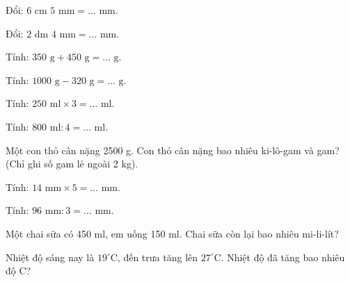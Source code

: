 \begin{ex}
Đổi: $6\text{ cm } 5\text{ mm} = \dots\text{ mm}$.
\end{ex}

\begin{ex}
Đổi: $2\text{ dm } 4\text{ mm} = \dots\text{ mm}$.
\end{ex}

\begin{ex}
Tính: $350\text{ g} + 450\text{ g} = \dots\text{ g}$.
\end{ex}

\begin{ex}
Tính: $1000\text{ g} - 320\text{ g} = \dots\text{ g}$.
\end{ex}

\begin{ex}
Tính: $250\text{ ml} \times 3 = \dots\text{ ml}$.
\end{ex}

\begin{ex}
Tính: $800\text{ ml} : 4 = \dots\text{ ml}$.
\end{ex}

\begin{ex}
Một con thỏ cân nặng 2500 g. Con thỏ cân nặng bao nhiêu ki-lô-gam và gam? (Chỉ ghi số gam lẻ ngoài 2 kg).
\end{ex}

\begin{ex}
Tính: $14\text{ mm} \times 5 = \dots\text{ mm}$.
\end{ex}

\begin{ex}
Tính: $96\text{ mm} : 3 = \dots\text{ mm}$.
\end{ex}

\begin{ex}
Một chai sữa có 450 ml, em uống 150 ml. Chai sữa còn lại bao nhiêu mi-li-lít?
\end{ex}

\begin{ex}
Nhiệt độ sáng nay là $19^\circ$C, đến trưa tăng lên $27^\circ$C. Nhiệt độ đã tăng bao nhiêu độ C?
\end{ex}

